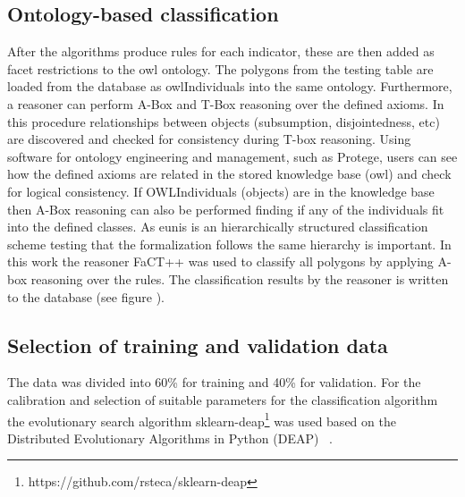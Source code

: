 \documentclass[authoryear,review,12pt,number]{elsarticle}
\begin{document}
\subsection{Ontology-based classification}
\label{subsec:Onto_classification}
After the algorithms produce rules for each indicator, these are then added as
facet restrictions to the \gls{owl} ontology. The polygons from the testing
table are loaded from the database as \gls{owl}Individuals into the same
ontology. Furthermore, a reasoner can perform A-Box and T-Box reasoning over the
defined axioms. In this procedure relationships between objects (subsumption,
disjointedness, etc) are discovered and checked for consistency during T-box
reasoning. Using software for ontology engineering and management, such as
Protege, users can see how the defined axioms are related in the stored
knowledge base (\gls{owl}) and check for logical consistency. If OWLIndividuals
(objects) are in the knowledge base then A-Box reasoning can also be performed
finding if any of the individuals fit into the defined classes. As \gls{eunis}
is an hierarchically structured classification scheme testing that the
formalization follows the same hierarchy is important.
In this work the reasoner FaCT++ was used to classify all polygons by applying
A-box reasoning over the rules. The classification results by the reasoner is
written to the database (see figure \label{fig:full_workflow}).

\subsection{Selection of training and validation data}
\label{subsec:Selection_of_training_validation_data}
The data was divided into 60\% for training and 40\% for validation. For the 
calibration and selection of suitable parameters for the classification 
algorithm the evolutionary search algorithm 
sklearn-deap\footnote{https://github.com/rsteca/sklearn-deap} was used based 
on the Distributed Evolutionary	Algorithms in Python (DEAP) 
~\citep{DEAP_JMLR2012}.

\end{document}
